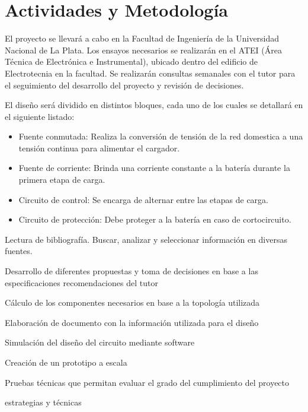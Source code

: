\section*{Actividades y Metodología}
El proyecto se llevará a cabo en la Facultad de Ingeniería de la Universidad Nacional de La Plata.
Los ensayos necesarios se realizarán en el ATEI (Área Técnica de Electrónica e Instrumental),
ubicado dentro del edificio de Electrotecnia en la facultad.
Se realizarán consultas semanales con el tutor para el seguimiento del desarrollo del proyecto y revisión de decisiones.

El diseño será dividido en distintos bloques, cada uno de los cuales se detallará en el siguiente listado:
\begin{itemize}
    \item Fuente conmutada: Realiza la conversión de tensión de la red domestica a una tensión continua para alimentar el cargador.
    \item Fuente de corriente: Brinda una corriente constante a la batería durante la primera etapa de carga.
    \item Circuito de control: Se encarga de alternar entre las etapas de carga.
    \item Circuito de protección: Debe proteger a la batería en caso de cortocircuito.
\end{itemize} 

Lectura de bibliografía. Buscar, analizar y seleccionar información en diversas fuentes.

Desarrollo de diferentes propuestas y toma de decisiones en base a las especificaciones recomendaciones del tutor

Cálculo de los componentes necesarios en base a la topología utilizada

Elaboración de documento con la información utilizada para el diseño 

Simulación del diseño del circuito mediante software

Creación de un prototipo a escala

Pruebas técnicas que permitan evaluar el grado del cumplimiento del proyecto

estrategias y técnicas